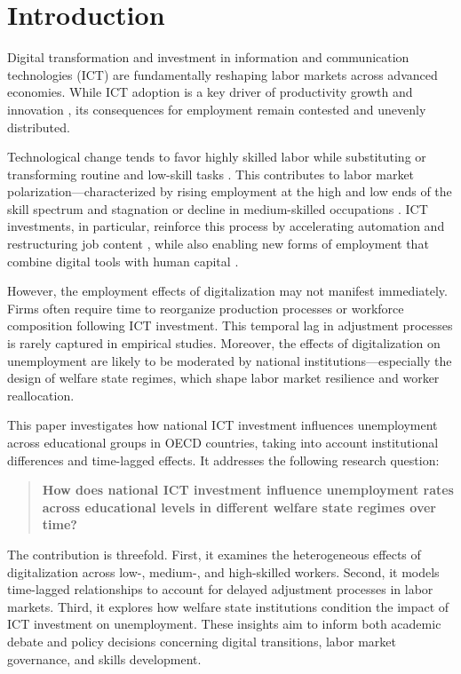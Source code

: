 
\section{Introduction}

Digital transformation and investment in information and communication technologies (ICT) are 
fundamentally reshaping labor markets across advanced economies. While ICT adoption is a key driver 
of productivity growth and innovation \parencite[][p.~49]{oecd2019measuring}, its consequences for 
employment remain contested and unevenly distributed.

Technological change tends to favor highly skilled labor while substituting or transforming routine 
and low-skill tasks \parencite[][p.~1045]{acemoglu2011skills}. This contributes to labor market 
polarization—characterized by rising employment at the high and low ends of the skill spectrum and 
stagnation or decline in medium-skilled occupations \parencite[][p.~1070]{acemoglu2011skills}. ICT 
investments, in particular, reinforce this process by accelerating automation and restructuring job 
content \parencite[][pp.~2--4]{balsmeier2019isthis}, while also enabling new forms of employment 
that combine digital tools with human capital \parencite[][pp.~210--214]{brynjolfsson2014thesecond}.

However, the employment effects of digitalization may not manifest immediately. Firms often require 
time to reorganize production processes or workforce composition following ICT investment. This 
temporal lag in adjustment processes is rarely captured in empirical studies. Moreover, the effects 
of digitalization on unemployment are likely to be moderated by national institutions—especially the 
design of welfare state regimes, which shape labor market resilience and worker reallocation.

This paper investigates how national ICT investment influences unemployment across educational groups 
in OECD countries, taking into account institutional differences and time-lagged effects. It 
addresses the following research question:

\begin{quote}
\textbf{How does national ICT investment influence unemployment rates across educational levels in 
different welfare state regimes over time?}
\end{quote}

The contribution is threefold. First, it examines the heterogeneous effects of digitalization across 
low-, medium-, and high-skilled workers. Second, it models time-lagged relationships to account for 
delayed adjustment processes in labor markets. Third, it explores how welfare state institutions 
condition the impact of ICT investment on unemployment. These insights aim to inform both academic 
debate and policy decisions concerning digital transitions, labor market governance, and skills 
development.
